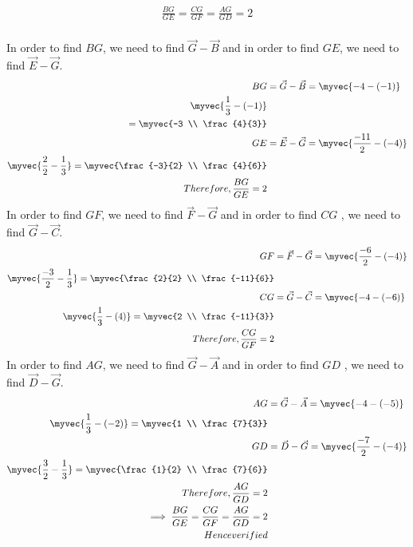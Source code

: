 \documentclass[11pt]{book}
\begin{document}
\begin{enumerate}[label=\thesection.\arabic*.,ref=\thesection.\theenumi]
	\begin{align}
\frac{BG}{GE}=\frac{CG}{GF}=\frac{AG}{GD}=2
         \end{align}
            \\ 
             \solution
In order to find $BG$, we need to find
$\vec{G}-\vec{B}$ and in order to find $GE$, we need to find $\vec{E}-\vec{G}$.
\begin{align}
	BG&=\vec{G}-\vec{B}=\myvec{-4 -(-1)} \\ \myvec{\frac{1}{3}-(-1)} \\
=\myvec{-3 \\ \frac{4}{3}} \\
	GE&=\vec{E}-\vec{G}=\myvec{\frac{-11}{2}-(-4)} \\ \myvec{\frac{2}{2} - \frac{1}{3}}=\myvec{\frac{-3}{2} \\ \frac{4}{6}} \\
Therefore, \frac{BG}{GE}=2 \\ 
\end{align}
In order to find $GF$, we need to find $\vec{F}-\vec{G}$ and in order to find $CG$
, we need to find $\vec{G}-\vec{C}$.
\begin{align}
	GF&=\vec{F}-\vec{G}=\myvec{\frac{-6}{2}-(-4)} \\ \myvec{\frac{-3}{2} - \frac{1}{3}}= \myvec{\frac{2}{2} \\ \frac{-11}{6}} \\
	CG&=\vec{G}-\vec{C}=\myvec{-4 - (-6)} \\ \myvec{\frac{1}{3}-(4)}=\myvec{2 \\ \frac{-11}{3}} \\
Therefore, \frac{CG}{GF}=2
\end{align}
In order to find $AG$, we need to find $
\vec{G}-\vec{A}$ and in order to find $GD$
, we need to find $\vec{D}-\vec{G}$.
\begin{align}
	AG&=\vec{G}-\vec{A}=\myvec{-4 -(-5)} \\ \myvec{\frac{1}{3}-(-2)}=\myvec{1 \\ \frac{7}{3}} \\
	GD&=\vec{D}-\vec{G}=\myvec{\frac{-7}{2}-(-4)} \\ \myvec{\frac{3}{2}-\frac{1}{3}}=\myvec{\frac{1}{2} \\ \frac{7}{6}} \\
Therefore, \frac{AG}{GD}=2 \\
\implies \frac{BG}{GE}=\frac{CG}{GF}=\frac{AG}{GD}=2 \\
Hence verified \\

\end{align}
\end{enumerate}
\end{document}
